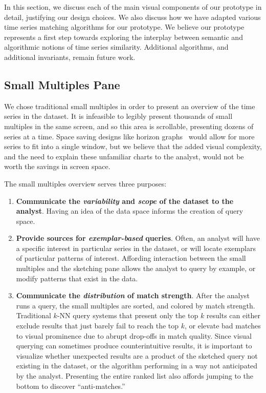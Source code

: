 In this section, we discuss each of the main visual components of our prototype in detail, justifying our design choices. We also discuss how we have adapted various time series matching algorithms for our prototype. We believe our prototype represents a first step towards exploring the interplay between semantic and algorithmic notions of time series similarity. Additional algorithms, and additional invariants, remain future work.

\subsection{Small Multiples Pane}
\label{sec:smallmultiples}
We chose traditional small multiples in order to present an overview of the time series in the dataset. It is infeasible to legibly present thousands of small multiples in the same screen, and so this area is scrollable, presenting dozens of series at a time. Space saving designs like horizon graphs~\cite{saito2005two} would allow for more series to fit into a single window, but we believe that the added visual complexity, and the need to explain these unfamiliar charts to the analyst, would not be worth the savings in screen space.

The small multiples overview serves three purposes:
\begin{enumerate}
	\item \textbf{Communicate the \emph{variability} and \emph{scope} of the dataset to the analyst}. Having an idea of the data space informs the creation of query space.
	\item \textbf{Provide sources for \emph{exemplar-based} queries}. Often, an analyst will have a specific interest in particular series in the dataset, or will locate exemplars of particular patterns of interest. Affording interaction between the small multiples and the sketching pane allows the analyst to query by example, or modify patterns that exist in the data.
	\item \textbf{Communicate the \emph{distribution} of match strength}. After the analyst runs a query, the small multiples are sorted, and colored by match strength. Traditional $k$-NN query systems that present only the top $k$ results can either exclude results that just barely fail to reach the top $k$, or elevate bad matches to visual prominence due to abrupt drop-offs in match quality. Since visual querying can sometimes produce counterintuitive results, it is important to visualize whether unexpected results are a product of the sketched query not existing in the dataset, or the algorithm performing in a way not anticipated by the analyst. Presenting the entire ranked list also affords jumping to the bottom to discover ``anti-matches.''
\end{enumerate}

